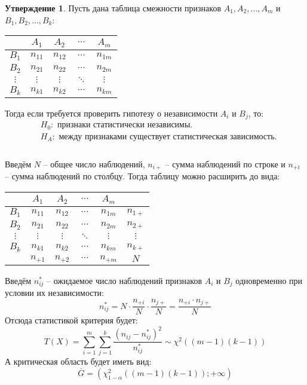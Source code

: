 \documentclass[12pt]{article}
\theoremstyle{definition}
\newtheorem{statement}[theorem]{Утверждение}
\begin{document}
\begin{statement}
    Пусть дана таблица смежности признаков $A_1,A_2,\ldots,A_m$ и $B_1,B_2,\ldots,B_k$:
    \begin{center}
        \begin{tabular}{c|cccc}
            & $A_1$ & $A_2$ & $\cdots$ & $A_m$\\
            \hline
            $B_1$ & $n_{11}$ & $n_{12}$ & $\cdots$ & $n_{1m}$\\
            $B_2$ & $n_{21}$ & $n_{22}$ & $\cdots$ & $n_{2m}$\\
            $\vdots$ & $\vdots$ & $\vdots$ & $\ddots$ & $\vdots$\\
            $B_k$ & $n_{k1}$ & $n_{k2}$ & $\cdots$ & $n_{km}$\\
        \end{tabular}
    \end{center}
    Тогда если требуется проверить гипотезу о независимости $A_i$ и $B_j$, то:
    \begin{align*}
        &H_0: \text{ признаки статистически независимы.}\\
        &H_A: \text{ между признаками существует статистическая зависимость.}\\
    \end{align*}
    \\[-2\baselineskip]
    Введём $N$ – общее число наблюдений, $n_{i+}$ – сумма наблюдений по строке и $n_{+i}$ – сумма наблюдений по столбцу. Тогда таблицу можно расширить до вида:
    \begin{center}
        \begin{tabular}{c|cccc|c}
            & $A_1$ & $A_2$ & $\cdots$ & $A_m$ &\\
            \hline
            $B_1$ & $n_{11}$ & $n_{12}$ & $\cdots$ & $n_{1m}$ & $n_{1+}$\\
            $B_2$ & $n_{21}$ & $n_{22}$ & $\cdots$ & $n_{2m}$ & $n_{2+}$\\
            $\vdots$ & $\vdots$ & $\vdots$ & $\ddots$ & $\vdots$ & $\vdots$\\
            $B_k$ & $n_{k1}$ & $n_{k2}$ & $\cdots$ & $n_{km}$ & $n_{k+}$\\
            \hline
            & $n_{+1}$ & $n_{+2}$ & $\cdots$ & $n_{+m}$ & $N$
        \end{tabular}
    \end{center}
    Введём $n_{ij}^*$ – ожидаемое число наблюдений признаков $A_i$ и $B_j$ одновременно при условии их независимости:
    $$n_{ij}^*=N\cdot\frac{n_{+i}}{N}\cdot\frac{n_{j+}}{N}=\frac{n_{+i}\cdot n_{j+}}{N}$$
    Отсюда статистикой критерия будет:
    $$T(X)=\sum_{i=1}^{m}\sum_{j=1}^{k}\frac{(n_{ij}-n_{ij}^*)^2}{n_{ij}^*}\sim \chi^2\left((m-1)(k-1)\right)$$
    А критическая область будет иметь вид:
    $$\overline{G}=\left(\chi^2_{1-\alpha}((m-1)(k-1));+\infty\right)$$
\end{statement}
\end{document}
